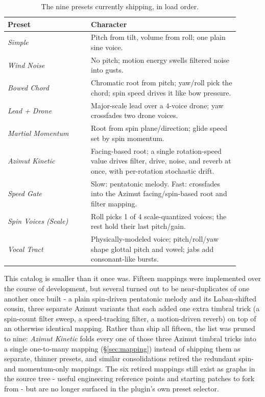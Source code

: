 \documentclass[a4paper,10pt,oneside]{article}
\newcommand{\preset}[1]{\textit{#1}}
\begin{document}
\begin{sloppy}
\begin{table}[t]
\centering
\small
\begin{tabular}{@{}p{0.32\linewidth}p{0.58\linewidth}@{}}
\toprule
Preset & Character \\
\midrule
\preset{Simple} & Pitch from tilt, volume from roll; one plain sine voice. \\
\preset{Wind Noise} & No pitch; motion energy swells filtered noise into gusts. \\
\preset{Bowed Chord} & Chromatic root from pitch; yaw/roll pick the chord; spin speed drives it like bow pressure. \\
\preset{Lead + Drone} & Major-scale lead over a 4-voice drone; yaw crossfades two drone voices. \\
\preset{Martial Momentum} & Root from spin plane/direction; glide speed set by spin momentum. \\
\preset{Azimut Kinetic} & Facing-based root; a single rotation-speed value drives filter, drive, noise, and reverb at once, with per-rotation stochastic drift. \\
\preset{Speed Gate} & Slow: pentatonic melody. Fast: crossfades into the Azimut facing/spin-based root and filter mapping. \\
\preset{Spin Voices (Scale)} & Roll picks 1 of 4 scale-quantized voices; the rest hold their last pitch/gain. \\
\preset{Vocal Tract} & Physically-modeled voice; pitch/roll/yaw shape glottal pitch and vowel; jabs add consonant-like bursts. \\
\bottomrule
\end{tabular}
\caption{The nine presets currently shipping, in load order.}
\label{tab:presets}
\end{table}
\FloatBarrier

This catalog is smaller than it once was. Fifteen mappings were implemented over the
course of development, but several turned out to be near-duplicates of one another once
built - a plain spin-driven pentatonic melody and its Laban-shifted cousin, three
separate Azimut variants that each added one extra timbral trick (a spin-count filter
sweep, a speed-tracking filter, a motion-driven reverb) on top of an otherwise identical
mapping. Rather than ship all fifteen, the list was pruned to nine: \preset{Azimut
Kinetic} folds every one of those three Azimut timbral tricks into a single one-to-many
mapping (\S\ref{sec:mapping}) instead of shipping them as separate, thinner presets, and
similar consolidations retired the redundant spin- and momentum-only mappings. The six
retired mappings still exist as graphs in the source tree - useful engineering reference
points and starting patches to fork from - but are no longer surfaced in the plugin's
own preset selector.


\end{sloppy}
\end{document}

